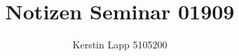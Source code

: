 \documentclass[11pt]{article}
\title{Notizen Seminar 01909}
\author{Kerstin Lapp 5105200}
\begin{document}






\nocite{*}




\newpage

\end{document}
